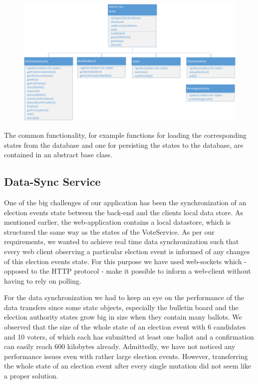 \begin{figure}
\begin{center}
\includegraphics[scale=0.60]{assets/uml_actors.pdf}
\label{Actor classes}%
\end{center}
\end{figure}
The common functionality, for example functions for loading the corresponding states from the database and one for persisting the states to the database, are contained in an abstract base class.

\newpage
\subsection{Data-Sync Service}
One of the big challenges of our application has been the synchronization of an election events state between the back-end and the clients local data store. As mentioned earlier, the web-application contains a local datastore, which is structured the same way as the states of the VoteService. As per our requirements, we wanted to achieve real time data synchronization such that every web client observing a particular election event is informed of any changes of this election events state. For this purpose we have used web-sockets which - opposed to the HTTP protocol - make it possible to inform a web-client without having to rely on polling.

For the data synchronization we had to keep an eye on the performance of the data transfers since some state objects, especially the bulletin board and the election authority states grow big in size when they contain many ballots. We observed that the size of the whole state of an election event with 6 candidates and 10 voters, of which each has submitted at least one ballot and a confirmation can easily reach 600 kilobytes already. Admittedly, we have not noticed any performance issues even with rather large election events. However, transferring the whole state of an election event after every single mutation did not seem like a proper solution.

